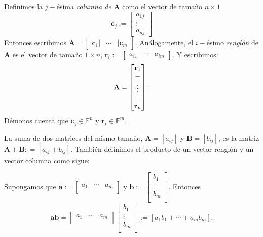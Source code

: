             Definimos la $j-$ésima \textit{columna de}  $\mathbf{A}$ como el vector de tamaño $n \times 1$ $$\mathbf{c}_{j} := \begin{bmatrix}
            a_{1j} \\ 
            \vdots\\
            a_{nj}
            \end{bmatrix}
            $$ Entonces escribimos $\mathbf{A} = \begin{bmatrix}
            \mathbf{c}_{1} | & \cdots & |\mathbf{c}_{m}
            \end{bmatrix}.$  Análogamente, el $i-$ésimo \textit{renglón} de $\mathbf{A}$ es el vector de tamaño $1 \times n$, $\mathbf{r}_{i}:= \begin{bmatrix}
            a_{i1} & \cdots & a_{im}
            \end{bmatrix}.$ Y escribimos: $$\mathbf{A} = \begin{bmatrix}
            \mathbf{r}_{1}\\
            \--\\
            \vdots \\
            \--\\
            \mathbf{r}_{n}
            \end{bmatrix}.$$ Démonos cuenta que $\mathbf{c}_{j} \in \mathbb{F}^{n}$ y $\mathbf{r}_{i} \in \mathbb{F}^{m}$.    

          
            La suma  de dos matrices del mismo tamaño, $\mathbf{A} = [a_{ij}]$ y $\mathbf{B} = [b_{ij}]$, es la matriz $\mathbf{A+B}: = [a_{ij} + b_{ij}]$. También definimos el producto de un vector renglón y un vector columna como sigue:
            
            Supongamos que $\mathbf{a}:=\begin{bmatrix}
            a_{1} & \cdots & a_{m}\\ 
            \end{bmatrix}$ y $\mathbf{b}:=\begin{bmatrix}
            b_{1} \\ 
            \vdots\\
            b_{m}\\ 
            \end{bmatrix}$. Entonces $$\mathbf{a}\mathbf{b} = \begin{bmatrix}
            a_{1} & \cdots & a_{m}\\ 
            \end{bmatrix} \begin{bmatrix}
            b_{1} \\ 
            \vdots\\
            b_{m}\\ 
            \end{bmatrix}:= [a_{1}b_{1} + \cdots + a_{m}b_{m}].$$

